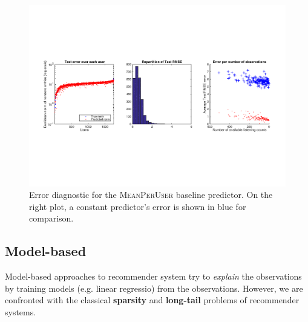 \documentclass[10pt,a4paper]{article}
\begin{document}
  \begin{figure}[ht]
    \center
      \includegraphics[width=14cm]{figures/recommendation/baseline-predictor-plots.pdf}
    \caption{Error diagnostic for the \textsc{MeanPerUser} baseline predictor. On the right plot, a constant predictor's error is shown in blue for comparison.}
    \label{fig:baseline-predictor-plots}
  \end{figure}


  \subsection{Model-based}
  Model-based approaches to recommender system try to \textit{explain} the observations by training models (e.g. linear regressio) from the observations. However, we are confronted with the classical \textbf{sparsity} and \textbf{long-tail} problems of recommender systems.\\
\end{document}
